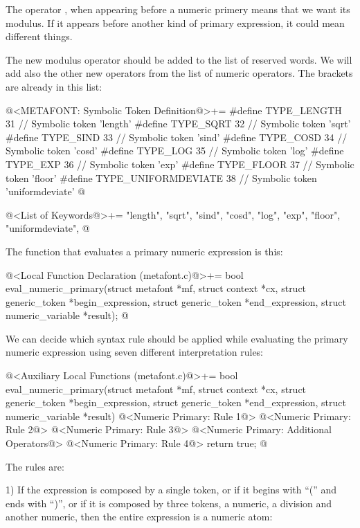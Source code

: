 The operator , when appearing before a numeric
primery means that we want its modulus. If it appears before another
kind of primary expression, it could mean different things.

The new modulus operator should be added to the list of reserved
words. We will add also the other new operators from the list of
numeric operators. The brackets are already in this list:

\iniciocodigo
@<METAFONT: Symbolic Token Definition@>+=
#define TYPE_LENGTH         31 // Symbolic token 'length'
#define TYPE_SQRT           32 // Symbolic token 'sqrt'
#define TYPE_SIND           33 // Symbolic token 'sind'
#define TYPE_COSD           34 // Symbolic token 'cosd'
#define TYPE_LOG            35 // Symbolic token 'log'
#define TYPE_EXP            36 // Symbolic token 'exp'
#define TYPE_FLOOR          37 // Symbolic token 'floor'
#define TYPE_UNIFORMDEVIATE 38 // Symbolic token 'uniformdeviate'
@
\fimcodigo

\iniciocodigo
@<List of Keywords@>+=
"length", "sqrt", "sind", "cosd", "log", "exp", "floor", "uniformdeviate",
@
\fimcodigo

The function that evaluates a primary numeric expression is this:

\iniciocodigo
@<Local Function Declaration (metafont.c)@>+=
bool eval_numeric_primary(struct metafont *mf, struct context *cx,
                          struct generic_token *begin_expression,
                          struct generic_token *end_expression,
                          struct numeric_variable *result);
@
\fimcodigo


We can decide which syntax rule should be applied while evaluating the
primary numeric expression using seven different interpretation rules:

\iniciocodigo
@<Auxiliary Local Functions (metafont.c)@>+=
bool eval_numeric_primary(struct metafont *mf, struct context *cx,
                          struct generic_token *begin_expression,
                          struct generic_token *end_expression,
                          struct numeric_variable *result){
  @<Numeric Primary: Rule 1@>
  @<Numeric Primary: Rule 2@>
  @<Numeric Primary: Rule 3@>
  @<Numeric Primary: Additional Operators@>
  @<Numeric Primary: Rule 4@>
  return true;
}
@

The rules are:

1) If the expression is composed by a single token, or if it begins
with ``('' and ends with ``)'', or if it is composed by three tokens,
a numeric, a division and another numeric, then the entire expression
is a numeric atom:

